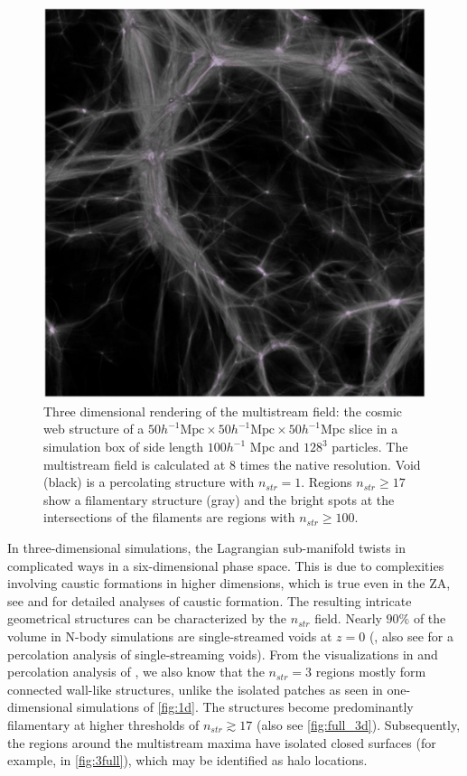 \begin{figure} 
\centering\includegraphics[width=16cm]{Chapter4/Source_v2/fig1.pdf} 
\caption{Three dimensional rendering of the multistream field: the cosmic web structure of a $ 50 h^{-1} \text{Mpc} \times 50 h^{-1} \text{Mpc} \times 50 h^{-1} \text{Mpc}$ slice in a simulation box of side length $100 h^{-1}$ Mpc and $128^3$ particles. The multistream field is calculated at 8 times the native resolution. Void (black) is a percolating structure with $n_{str} = 1$. Regions $n_{str} \geq 17$ show a filamentary structure (gray) and the bright spots at the intersections of the filaments are regions with $n_{str} \geq 100$. }
\label{fig:full_3d}
\end{figure}

In three-dimensional simulations, the Lagrangian sub-manifold twists in complicated ways in a six-dimensional phase space. This is due to complexities involving caustic formations in higher dimensions, which is true even in the ZA, see \citealt{Arnold1982} and \citealt{Hidding2014} for detailed analyses of caustic formation. The resulting intricate geometrical structures can be characterized by the $n_{str}$ field. Nearly  $90\%$ of the volume in N-body simulations are single-streamed voids at $z=0$ (\citealt{Shandarin2012}, also see \citealt{Falck2015} for a percolation analysis of single-streaming voids). From the visualizations in \cite{Ramachandra2015} and percolation analysis of \cite{Ramachandra2017}, we also know that the $n_{str} = 3$ regions mostly form connected wall-like structures, unlike the isolated patches as seen in one-dimensional simulations of \autoref{fig:1d}. The structures become predominantly filamentary at higher thresholds of $ n_{str} \gtrsim 17$ (also see \autoref{fig:full_3d}). Subsequently, the regions around the multistream maxima have isolated closed surfaces (for example, in \autoref{fig:3full}), which may be identified as halo locations. 



